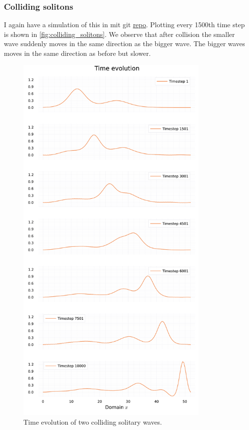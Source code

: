 \documentclass[
	a4paper, %
	10pt, %
]{CSUniSchoolLabReport}
\begin{document}
\subsubsection{Colliding solitons}

I again have a simulation of this in mit git \href{https://github.com/simonblaue/MCP-Ex4.git}{repo}. Plotting every 1500th time step is shown in \autoref{fig:colliding_solitons}. We observe that after collision the smaller wave suddenly moves in the same direction as the bigger wave. The bigger waves moves in the same direction as before but slower. 

\begin{figure}
	\centering
	\includegraphics[width=0.85\textwidth]{../saves_t3/colliding_solitons.pdf}
	\caption{Time evolution of two colliding solitary waves.}
	\label{fig:colliding_solitons}
\end{figure}
\end{document}
